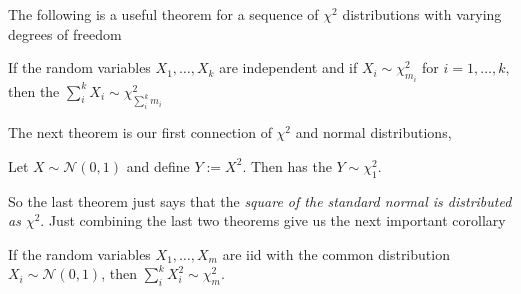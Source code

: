 \documentclass[ 11pt,%
				a4paper,%
				twoside,%
				headinclude,%
				footinclude = true,%
				cleardoublepage = empty,%
				reqno]{scrbook}
\begin{document}
\marginbreak{0pt}


The following is a useful theorem for a sequence of $\chi^{2}$ distributions with varying degrees of freedom

\begin{theorem}
If the random variables $X_{1}, \ldots, X_{k}$ are independent and if $X_{i}\sim\chi^{2}_{m_i}$ for $i=1, \ldots, k,$ then the $\sum_i^k X_i \sim \chi^{2}_{\sum_i^k m_i}$ 
\end{theorem}

The next theorem is our first connection of $\chi^{2}$ and normal distributions,



\begin{theorem}
  Let $X \sim \mathcal{N}(0, 1)$ and define $Y:=X^{2}$. Then has the $Y \sim \chi^{2}_1$.
\end{theorem}

So the last theorem just says that the \emph{square of the standard normal is distributed as $\chi^{2}$}. Just combining the last two theorems give us the next important corollary

\begin{corollary}
  If the random variables $X_{1}, \ldots, X_{m}$ are iid with the common distribution $X_i \sim \mathcal{N}(0, 1)$, then $\sum_i^k X_i^2 \sim \chi^{2}_m$.
\end{corollary}
\end{document}
